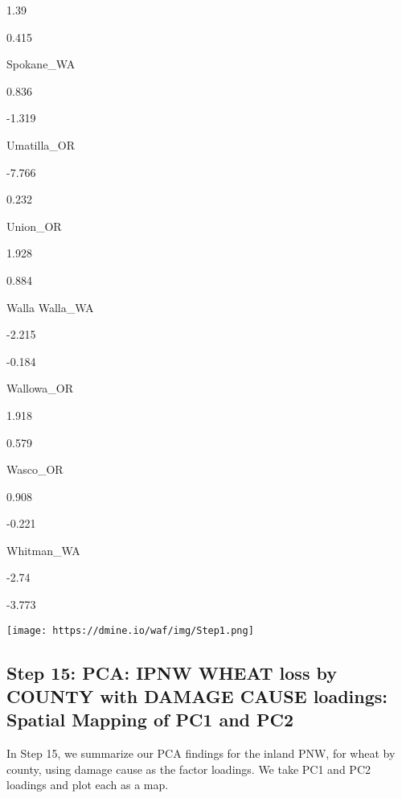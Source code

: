 \documentclass[]{article}
\begin{document}
1.39

0.415

Spokane\_WA

0.836

-1.319

Umatilla\_OR

-7.766

0.232

Union\_OR

1.928

0.884

Walla Walla\_WA

-2.215

-0.184

Wallowa\_OR

1.918

0.579

Wasco\_OR

0.908

-0.221

Whitman\_WA

-2.74

-3.773

\texttt{[image: https://dmine.io/waf/img/Step1.png]}

\hypertarget{step-15-pca-ipnw-wheat-loss-by-county-with-damage-cause-loadings-spatial-mapping-of-pc1-and-pc2}{%
\subsection{Step 15: PCA: IPNW WHEAT loss by COUNTY with DAMAGE CAUSE
loadings: Spatial Mapping of PC1 and
PC2}\label{step-15-pca-ipnw-wheat-loss-by-county-with-damage-cause-loadings-spatial-mapping-of-pc1-and-pc2}}

In Step 15, we summarize our PCA findings for the inland PNW, for wheat
by county, using damage cause as the factor loadings. We take PC1 and
PC2 loadings and plot each as a map.
\end{document}
